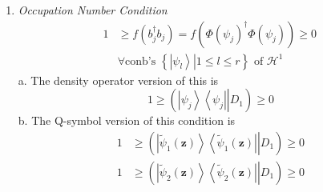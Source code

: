 \documentclass[aps,preprint]{revtex4}%
\begin{document}
\begin{enumerate}
\begin{equation}
{}\right\vert \right\vert D_{2}\right)  \geq0.
\end{equation}
b. The Q-symbol version of this condition is%
\begin{equation}
1\geq\left(  \left.  \left\vert \tilde{\psi}_{1}\left(  \mathbf{z}\right)
\right\rangle \left\langle \tilde{\psi}_{1}\left(  \mathbf{z}\right)
\right\vert \right\vert D_{1}\right)  +\left(  \left.  \left\vert \tilde{\psi
}_{2}\left(  \mathbf{z}\right)  \right\rangle \left\langle \tilde{\psi}%
_{2}\left(  \mathbf{z}\right)  \right\vert \right\vert D_{1}\right)  -\left(
\left.  \left\vert \tilde{\psi}_{1}\left(  \mathbf{z}\right)  \tilde{\psi}%
_{2}\left(  \mathbf{z}\right)  \right\rangle \left\langle \tilde{\psi}%
_{1}\left(  \mathbf{z}\right)  \tilde{\psi}_{2}\left(  \mathbf{z}\right)
\right\vert \right\vert D_{2}\right)  \geq0.\nonumber
\end{equation}


\item \emph{Occupation Number Condition}
\begin{align}
1  &  \geq f\left(  b_{j}^{\dagger}b_{j}\right)  =f\left(  \Phi\left(
\psi_{j}\right)  ^{\dagger}\Phi\left(  \psi_{j}\right)  \right)
\geq0\,\nonumber\\
&  \forall\text{conb's }\left\{  \left.  \left\vert \psi_{l}\right\rangle
\right\vert 1\leq l\leq r\right\}  \text{ of }\mathcal{H}^{1}%
\end{align}
a. The density operator version of this is%
\begin{equation}
1\geq\left(  \left.  \left\vert \psi_{j}\right\rangle \left\langle \psi
_{j}\right\vert \right\vert D_{1}\right)  \geq0
\end{equation}
b. The Q-symbol version of this condition is%
\begin{align}
1  &  \geq\left(  \left.  \left\vert \tilde{\psi}_{1}\left(  \mathbf{z}%
\right)  \right\rangle \left\langle \tilde{\psi}_{1}\left(  \mathbf{z}\right)
\right\vert \right\vert D_{1}\right)  \geq0\nonumber\\
1  &  \geq\left(  \left.  \left\vert \tilde{\psi}_{2}\left(  \mathbf{z}%
\right)  \right\rangle \left\langle \tilde{\psi}_{2}\left(  \mathbf{z}\right)
\right\vert \right\vert D_{1}\right)  \geq0
\end{align}



\end{enumerate}
\end{document}
